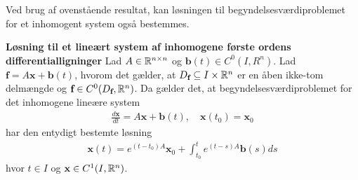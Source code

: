 Ved brug af ovenstående resultat, kan løsningen til begyndelsesværdiproblemet for et inhomogent system også bestemmes. 

\begin{minipage}\textwidth
\begin{thmx} \textbf{Løsning til et lineært system af inhomogene første ordens differentialligninger} \label{sæt:løsning_til_inhomogen_system}%
\newline
Lad $A \in \mathbb{R}^{n \times n}$ og $\mathbf{b}(t) \in C^0(I,R^n)$. Lad $\textbf{f} = A\textbf{x}+\textbf{b}(t)$, hvorom det gælder, at $D_\textbf{f} \subseteq I\times \mathbb{R}^n$ er en åben ikke-tom delmængde og $\textbf{f} \in C^0(D_\textbf{f}, \mathbb{R}^n)$. Da gælder det, at begyndelsesværdiproblemet for det inhomogene lineære system 
\begin{align}\label{eq:inhomogen_lineart_system}
    \frac{d\textbf{x}}{dt} = A\textbf{x}+\textbf{b}(t), \quad \mathbf{x}(t_0) = \mathbf{x}_0 
\end{align}
har den entydigt bestemte løsning 
\begin{align}\label{eq:løsning_til_inhomogen_lineart_system}
    \textbf{x}(t) = e^{(t-t_0)A}\textbf{x}_0 + \int_{t_0}^t e^{(t-s)A}\textbf{b}(s) ds
\end{align}
hvor $t\in I$ og $\textbf{x} \in C^1(I, \mathbb{R}^n)$.
\end{thmx}
\end{minipage}

